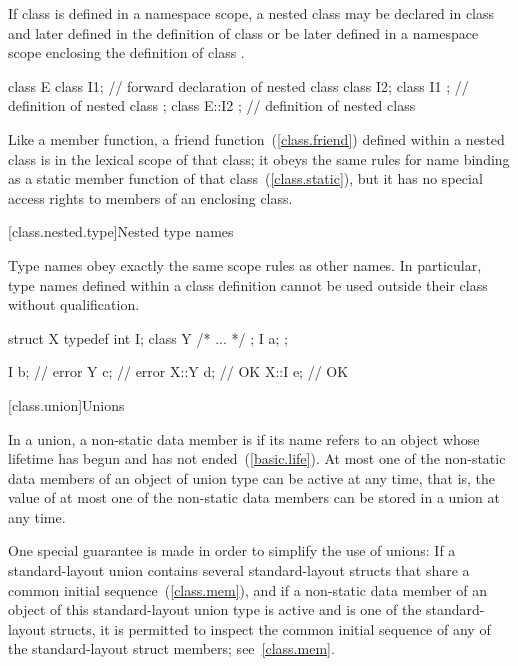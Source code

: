 \pnum
If class  is defined in a namespace scope, a nested class
 may be declared in class  and later defined in the
definition of class  or be later defined in a namespace scope
enclosing the definition of class .
%
\begin{example}

\begin{codeblock}
class E {
  class I1;                     // forward declaration of nested class
  class I2;
  class I1 { };                 // definition of nested class
};
class E::I2 { };                // definition of nested class
\end{codeblock}
\end{example}

\pnum
{}%
Like a member function, a friend function~(\ref{class.friend}) defined
within a nested class is in the lexical scope of that class; it obeys
the same rules for name binding as a static member function of that
class~(\ref{class.static}), but it has no special access rights to
members of an enclosing class.

[class.nested.type]{Nested type names}
%
%

\pnum
Type names obey exactly the same scope rules as other names. In
particular, type names defined within a class definition cannot be used
outside their class without qualification.
\begin{example}

%
\begin{codeblock}
struct X {
  typedef int I;
  class Y { /* ... */ };
  I a;
};

I b;                            // error
Y c;                            // error
X::Y d;                         // OK
X::I e;                         // OK
\end{codeblock}
\end{example}%

[class.union]{Unions}%

\pnum
In a union,
a non-static data member is 
if its name refers to an object
whose lifetime has begun and has not ended~(\ref{basic.life}).
At most one of the non-static data members of an object of union type
can be active at any
time, that is, the value of at most one of the non-static data members can be
stored in a union at any time. \begin{note} One special guarantee is made in order to
simplify the use of unions: If a standard-layout union contains several standard-layout
structs that share a common initial sequence~(\ref{class.mem}), and
if a non-static data member of an object of this standard-layout union type
is active and is one of the standard-layout structs,
it is permitted to inspect the common initial sequence
of any of the standard-layout struct members;
see~\ref{class.mem}.
\end{note}

